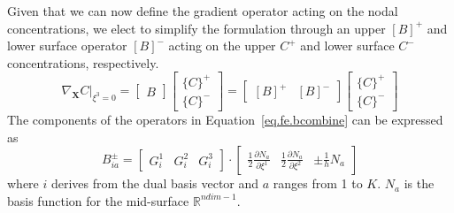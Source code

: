 \documentclass[10pt]{elsarticle}
\newcommand{\mbs}[1]{\boldsymbol{#1}}
\def\bs{{\mbs{s}}} \def\bt{{\mbs{t}}} \def\bu{{\mbs{u}}}
\def\bs{\boldsymbol}
\begin{document}
Given that we can now define the gradient operator acting on the nodal concentrations, we elect to simplify the formulation through an upper $[B]^{+}$ and lower surface operator $[B]^{-}$  acting on the upper ${C}^{+}$ and lower surface ${C}^{-}$ concentrations, respectively.
\begin{equation}
\label{eq.fe.bcombine} \nabla_{\bs{X}} C\big|_{\xi^{3} = 0} = 
\begin{bmatrix} B \end{bmatrix}
\begin{bmatrix} \{C\}^{+} \\ \{C\}^{-} \end{bmatrix} =
\begin{bmatrix} [B]^{+} & [B]^{-} \end{bmatrix}
\begin{bmatrix} \{C\}^{+} \\ \{C\}^{-} \end{bmatrix}
\end{equation}
The components of the operators in Equation~\eqref{eq.fe.bcombine} can be expressed as 
\begin{equation}
\label{eq.fe.bcomponents.plus} B^{\pm}_{ia} = \begin{bmatrix} G^{1}_{i} & G^{2}_{i} & G^{3}_{i} \end{bmatrix} \cdot  \begin{bmatrix} \frac{1}{2}\frac{\partial N_{a}}{\partial \xi^{1}} & \frac{1}{2}\frac{\partial N_{a}}{\partial \xi^{2}}  &  \pm \frac{1}{h} N_{a} \end{bmatrix}
\end{equation}
where  $i$ derives from the dual basis vector and $a$ ranges from 1 to $K$. $N_{a}$ is the basis function for the mid-surface $\mathbb{R}^{ndim-1}$.
\end{document}
